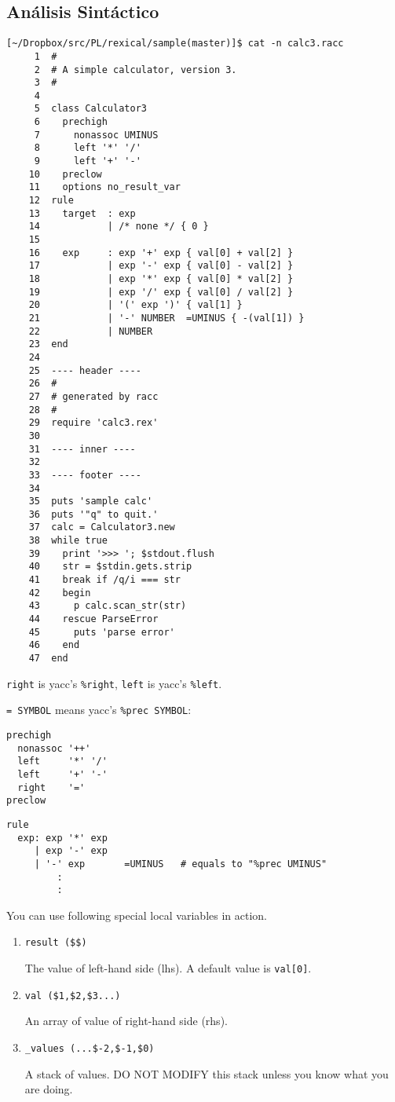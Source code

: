 \subsection{Análisis Sintáctico}
\begin{verbatim}
[~/Dropbox/src/PL/rexical/sample(master)]$ cat -n calc3.racc 
     1  #
     2  # A simple calculator, version 3.
     3  #
     4  
     5  class Calculator3
     6    prechigh
     7      nonassoc UMINUS
     8      left '*' '/'
     9      left '+' '-'
    10    preclow
    11    options no_result_var
    12  rule
    13    target  : exp
    14            | /* none */ { 0 }
    15  
    16    exp     : exp '+' exp { val[0] + val[2] }
    17            | exp '-' exp { val[0] - val[2] }
    18            | exp '*' exp { val[0] * val[2] }
    19            | exp '/' exp { val[0] / val[2] }
    20            | '(' exp ')' { val[1] }
    21            | '-' NUMBER  =UMINUS { -(val[1]) }
    22            | NUMBER
    23  end
    24  
    25  ---- header ----
    26  #
    27  # generated by racc
    28  #
    29  require 'calc3.rex'
    30  
    31  ---- inner ----
    32  
    33  ---- footer ----
    34  
    35  puts 'sample calc'
    36  puts '"q" to quit.'
    37  calc = Calculator3.new
    38  while true
    39    print '>>> '; $stdout.flush
    40    str = $stdin.gets.strip
    41    break if /q/i === str
    42    begin
    43      p calc.scan_str(str)
    44    rescue ParseError
    45      puts 'parse error'
    46    end
    47  end
\end{verbatim}


\verb'right' is yacc's \verb|%right|, \verb'left' is yacc's \verb|%left|.

\verb'= SYMBOL'  means yacc's \verb|%prec SYMBOL|:
\begin{verbatim}
prechigh
  nonassoc '++'
  left     '*' '/'
  left     '+' '-'
  right    '='
preclow
\end{verbatim}


\begin{verbatim}
rule
  exp: exp '*' exp
     | exp '-' exp
     | '-' exp       =UMINUS   # equals to "%prec UMINUS"
         :
         :
\end{verbatim}

You can use following special local variables in action.

\begin{enumerate}
\item
\begin{verbatim}
result ($$)
\end{verbatim}
The value of left-hand side (lhs). A default value is \verb|val[0]|.

\item
\begin{verbatim}
val ($1,$2,$3...)
\end{verbatim}
An array of value of right-hand side (rhs).

\item
\begin{verbatim}
_values (...$-2,$-1,$0)
\end{verbatim}
A stack of values. DO NOT MODIFY this stack unless you know what you are doing.
\end{enumerate}

